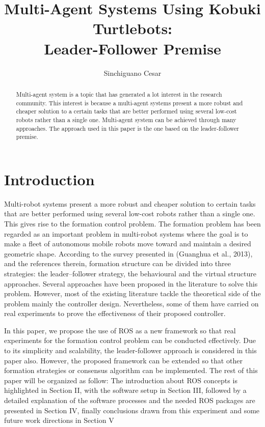 \documentclass[journal]{IEEEtran}
\begin{document}
%
\title{Multi-Agent Systems Using Kobuki Turtlebots:\\Leader-Follower Premise}
\author{Sinchiguano Cesar}


\maketitle

\begin{abstract}

Multi-agent system is a topic that has generated a lot interest in the research community. This interest is because a multi-agent systems present a more robust and cheaper solution to a certain tasks that are better performed using several low-cost robots rather than a single one. Multi-agent system can be achieved through many approaches. The approach used in this paper is the one based on the leader-follower premise.
\end{abstract}


\section{Introduction}


Multi-robot systems present a more robust and cheaper solution to certain tasks that are better performed using several low-cost robots rather than a single one. This gives rise to the formation control problem. The formation problem has been regarded as an important problem in multi-robot systems where the goal is to make a fleet of autonomous mobile robots move toward and maintain a desired geometric shape. According to the survey presented in (Guanghua et al., 2013)\cite{temp1}, and the references therein, formation structure can be divided into three strategies: the leader–follower strategy, the behavioural and the virtual structure approaches. Several approaches have been proposed in the literature to solve this problem. However, most of the existing literature tackle the theoretical side of the problem mainly the controller design. Nevertheless, some of them have carried on real experiments to prove the effectiveness of their proposed controller. 

In this paper, we propose the use of ROS as a new framework so that real experiments for the formation control problem can be conducted effectively. Due to its simplicity and scalability, the leader-follower approach is considered in this paper also. However, the proposed framework can be extended so that other formation strategies or consensus algorithm can be implemented. 
The rest of this paper will be organized as follow: The introduction about ROS concepts is highlighted in Section II, with the software setup in Section III, followed by a detailed explanation of the software processes and the needed ROS packages are presented  in Section IV, finally conclusions drawn from this experiment and some future work directions in Section V
\end{document}
